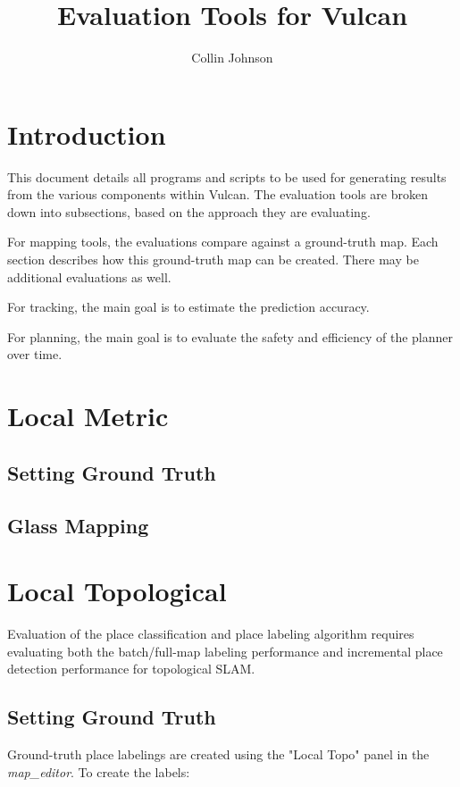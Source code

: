 \documentclass{article}
\title{Evaluation Tools for Vulcan}
\author{Collin Johnson}
\begin{document}
\tableofcontents

\section{Introduction}

This document details all programs and scripts to be used for generating results from the various components within 
Vulcan. The evaluation tools are broken down into subsections, based on the approach they are evaluating.

For mapping tools, the evaluations compare against a ground-truth map. Each section describes how this ground-truth map 
can be created. There may be additional evaluations as well.

For tracking, the main goal is to estimate the prediction accuracy.

For planning, the main goal is to evaluate the safety and efficiency of the planner over time.

\section{Local Metric}

\subsection{Setting Ground Truth}

\subsection{Glass Mapping}

\section{Local Topological}

Evaluation of the place classification and place labeling algorithm requires evaluating both the batch/full-map 
labeling performance and incremental place detection performance for topological SLAM.

\subsection{Setting Ground Truth}

Ground-truth place labelings are created using the "Local Topo" panel in the \emph{map\_editor}. To create the labels:
\end{document}
